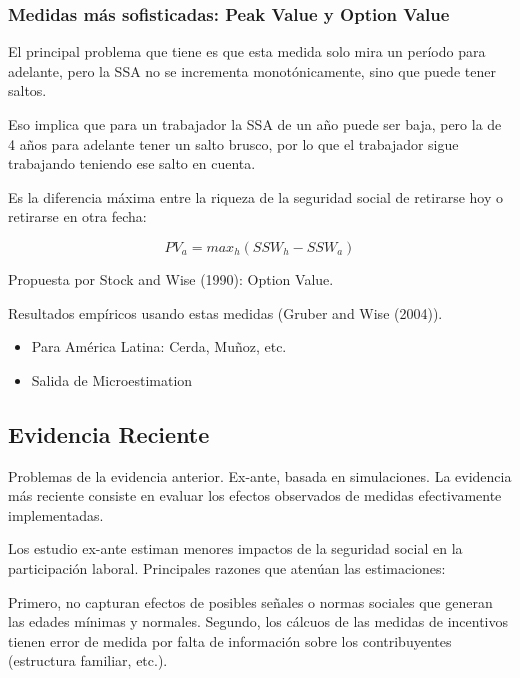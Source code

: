 \documentclass[]{article}
\providecommand{\tightlist}{%
  \setlength{\itemsep}{0pt}\setlength{\parskip}{0pt}}
\begin{document}
\hypertarget{medidas-muxe1s-sofisticadas-peak-value-y-option-value}{%
\subsubsection{Medidas más sofisticadas: Peak Value y Option
Value}\label{medidas-muxe1s-sofisticadas-peak-value-y-option-value}}

El principal problema que tiene es que esta medida solo mira un período
para adelante, pero la SSA no se incrementa monotónicamente, sino que
puede tener saltos.

Eso implica que para un trabajador la SSA de un año puede ser baja, pero
la de 4 años para adelante tener un salto brusco, por lo que el
trabajador sigue trabajando teniendo ese salto en cuenta.

Es la diferencia máxima entre la riqueza de la seguridad social de
retirarse hoy o retirarse en otra fecha:

\[ PV_{a} = max_{h}(SSW_{h}-SSW_{a}) \]

Propuesta por Stock and Wise (1990): Option Value.

Resultados empíricos usando estas medidas (Gruber and Wise (2004)).

\begin{itemize}
\tightlist
\item
  Para América Latina: Cerda, Muñoz, etc.
\end{itemize}

\begin{itemize}
\tightlist
\item
  Salida de Microestimation
\end{itemize}

\hypertarget{evidencia-reciente}{%
\subsection{Evidencia Reciente}\label{evidencia-reciente}}

Problemas de la evidencia anterior. Ex-ante, basada en simulaciones. La
evidencia más reciente consiste en evaluar los efectos observados de
medidas efectivamente implementadas.

Los estudio ex-ante estiman menores impactos de la seguridad social en
la participación laboral. Principales razones que atenúan las
estimaciones:

Primero, no capturan efectos de posibles señales o normas sociales que
generan las edades mínimas y normales. Segundo, los cálcuos de las
medidas de incentivos tienen error de medida por falta de información
sobre los contribuyentes (estructura familiar, etc.).
\end{document}
